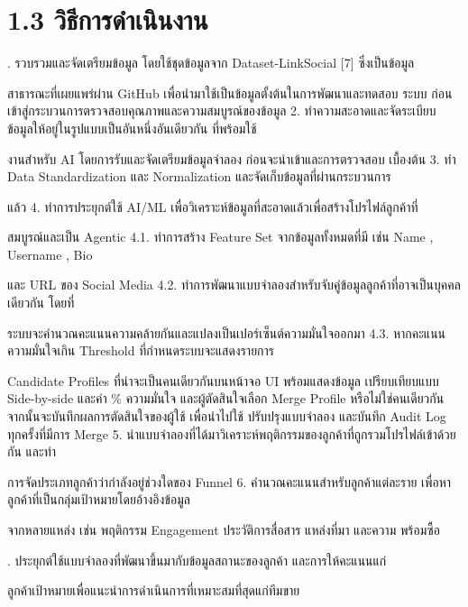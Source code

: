 \documentclass[12pt,a4paper]{report}
\begin{document}
\section*{1.3 วิธีการดําเนินงาน}
. รวบรวมและจัดเตรียมข้อมูล โดยใช้ชุดข้อมูลจาก Dataset-LinkSocial [7] ซึ่งเป็นข้อมูล\par
สาธารณะที่เผยแพร่ผ่าน GitHub เพื่อนำมาใช้เป็นข้อมูลตั้งต้นในการพัฒนาและทดสอบ ระบบ ก่อนเข้าสู่กระบวนการตรวจสอบคุณภาพและความสมบูรณ์ของข้อมูล 2. ทำความสะอาดและจัดระเบียบข้อมูลให้อยู่ในรูปแบบเป็นอันหนึ่งอันเดียวกัน ที่พร้อมใช้\par
งานสำหรับ AI โดยการรับและจัดเตรียมข้อมูลจำลอง ก่อนจะนำเข้าและการตรวจสอบ เบื้องต้น 3. ทำ Data Standardization และ Normalization และจัดเก็บข้อมูลที่ผ่านกระบวนการ\par
แล้ว 4. ทำการประยุกต์ใช้ AI/ML เพื่อวิเคราะห์ข้อมูลที่สะอาดแล้วเพื่อสร้างโปรไฟล์ลูกค้าที่\par
สมบูรณ์และเป็น Agentic 4.1. ทำการสร้าง Feature Set จากข้อมูลทั้งหมดที่มี เช่น Name , Username , Bio\par
และ URL ของ Social Media 4.2. ทำการพัฒนาแบบจำลองสำหรับจับคู่ข้อมูลลูกค้าที่อาจเป็นบุคคลเดียวกัน โดยที่\par
ระบบจะคำนวณคะแนนความคล้ายกันและแปลงเป็นเปอร์เซ็นต์ความมั่นใจออกมา 4.3. หากคะแนนความมั่นใจเกิน Threshold ที่กำหนดระบบจะแสดงรายการ\par
Candidate Profiles ที่น่าจะเป็นคนเดียวกันบนหน้าจอ UI พร้อมแสดงข้อมูล เปรียบเทียบแบบ Side-by-side และค่า \% ความมั่นใจ และผู้ตัดสินใจเลือก Merge Profile หรือไม่ใช่คนเดียวกัน จากนั้นจะบันทึกผลการตัดสินใจของผู้ใช้ เพื่อนำไปใช้ ปรับปรุงแบบจำลอง และบันทึก Audit Log ทุกครั้งที่มีการ Merge 5. นำแบบจำลองที่ได้มาวิเคราะห์พฤติกรรมของลูกค้าที่ถูกรวมโปรไฟล์เข้าด้วยกัน และทำ\par
การจัดประเภทลูกค้าว่ากำลังอยู่ช่วงใดของ Funnel 6. คำนวณคะแนนสำหรับลูกค้าแต่ละราย เพื่อหาลูกค้าที่เป็นกลุ่มเป้าหมายโดยอ้างอิงข้อมูล\par
จากหลายแหล่ง เช่น พฤติกรรม Engagement ประวัติการสื่อสาร แหล่งที่มา และความ พร้อมซื้อ\par
\clearpage
{}. ประยุกต์ใช้แบบจำลองที่พัฒนาขึ้นมากับข้อมูลสถานะของลูกค้า และการให้คะแนนแก่\par
ลูกค้าเป้าหมายเพื่อแนะนำการดำเนินการที่เหมาะสมที่สุดแก่ทีมขาย\par
\end{document}
